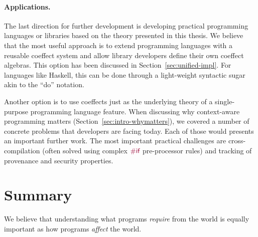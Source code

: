 
\paragraph{Applications.}
The last direction for further development is developing practical programming languages or
libraries based on the theory presented in this thesis. We believe that the most useful approach
is to extend programming languages with a reusable coeffect system and allow library developers
define their own coeffect algebras. This option has been discussed in Section~\ref{sec:unified-impl}.
For languages like Haskell, this can be done through a light-weight syntactic sugar akin to the
``do'' notation.

Another option is to use coeffects just as the underlying theory of a single-purpose programming
language feature. When discussing why context-aware programming matters (Section~\ref{sec:intro-whymatters}),
we covered a number of concrete problems that developers are facing today. Each of those would
presents an important further work. The most important practical challenges are cross-compilation
(often solved using complex $\prepk{\#if}$ pre-processor rules) and tracking of provenance
and security properties.



%
%

\section{Summary}
\label{sec:conc-conclusions}

We believe that understanding what programs \emph{require} from the world is equally important as
how programs \emph{affect} the world.

